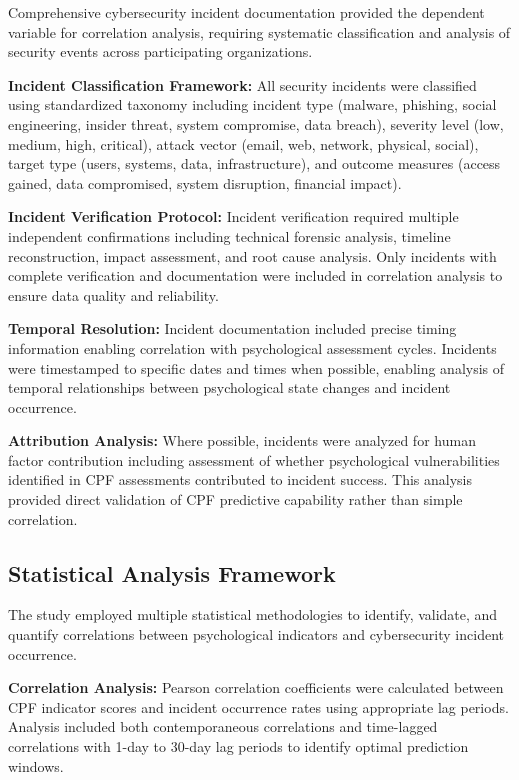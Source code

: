 \documentclass[10pt, twocolumn]{article}
\begin{document}
Comprehensive cybersecurity incident documentation provided the dependent variable for correlation analysis, requiring systematic classification and analysis of security events across participating organizations.

\textbf{Incident Classification Framework:} All security incidents were classified using standardized taxonomy including incident type (malware, phishing, social engineering, insider threat, system compromise, data breach), severity level (low, medium, high, critical), attack vector (email, web, network, physical, social), target type (users, systems, data, infrastructure), and outcome measures (access gained, data compromised, system disruption, financial impact).

\textbf{Incident Verification Protocol:} Incident verification required multiple independent confirmations including technical forensic analysis, timeline reconstruction, impact assessment, and root cause analysis. Only incidents with complete verification and documentation were included in correlation analysis to ensure data quality and reliability.

\textbf{Temporal Resolution:} Incident documentation included precise timing information enabling correlation with psychological assessment cycles. Incidents were timestamped to specific dates and times when possible, enabling analysis of temporal relationships between psychological state changes and incident occurrence.

\textbf{Attribution Analysis:} Where possible, incidents were analyzed for human factor contribution including assessment of whether psychological vulnerabilities identified in CPF assessments contributed to incident success. This analysis provided direct validation of CPF predictive capability rather than simple correlation.

\subsection{Statistical Analysis Framework}

The study employed multiple statistical methodologies to identify, validate, and quantify correlations between psychological indicators and cybersecurity incident occurrence.

\textbf{Correlation Analysis:} Pearson correlation coefficients were calculated between CPF indicator scores and incident occurrence rates using appropriate lag periods. Analysis included both contemporaneous correlations and time-lagged correlations with 1-day to 30-day lag periods to identify optimal prediction windows.
\end{document}
